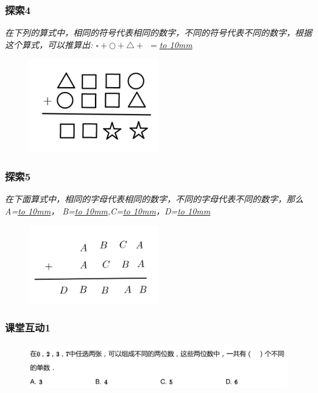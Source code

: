 \begin{frame}
    \frametitle{探索4}
    \textit{在下列的算式中，相同的符号代表相同的数字，不同的符号代表不同的数字，根据这个算式，可以推算出: $\square + \bigcirc + \triangle +$  $=$\underline{\hbox to 10mm{}}}
    \begin{figure}[H] 
        \centering
        \includegraphics[width=0.5\textwidth]{./pics/Chapter_3/tansuo4.png}
    \end{figure}
\end{frame}

\begin{frame}
    \frametitle{探索5}
    \textit{在下面算式中，相同的字母代表相同的数字，不同的字母代表不同的数字，那么A=\underline{\hbox to 10mm{}}， 
    B=\underline{\hbox to 10mm{}},C=\underline{\hbox to 10mm{}}，D=\underline{\hbox to 10mm{}}}
    \begin{figure}[H] 
        \centering
        \includegraphics[width=0.5\textwidth]{./pics/Chapter_3/tansuo5.png}
    \end{figure}
\end{frame}






\begin{frame}
    \frametitle{课堂互动1}
    \begin{figure}[H] 
        \centering
        \includegraphics[width=1\textwidth]{./pics/Chapter_2/ketanghudong1.png}
    \end{figure}
\end{frame}

